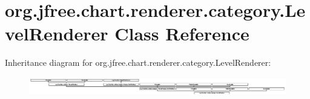 \hypertarget{classorg_1_1jfree_1_1chart_1_1renderer_1_1category_1_1_level_renderer}{}\section{org.\+jfree.\+chart.\+renderer.\+category.\+Level\+Renderer Class Reference}
\label{classorg_1_1jfree_1_1chart_1_1renderer_1_1category_1_1_level_renderer}
Inheritance diagram for org.\+jfree.\+chart.\+renderer.\+category.\+Level\+Renderer\+:\begin{figure}[H]
\begin{center}
\leavevmode
\includegraphics[height=0.824742cm]{classorg_1_1jfree_1_1chart_1_1renderer_1_1category_1_1_level_renderer}
\end{center}
\end{figure}
